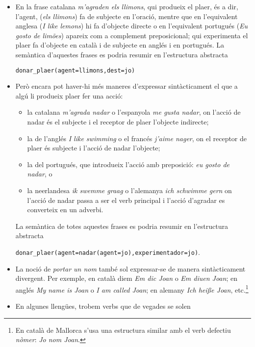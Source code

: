 \begin{itemize}
\item En la frase catalana \emph{m'agraden els llimons}, qui produeix
  el plaer, és a dir, l'agent, (\emph{els llimons}) fa de subjecte en
  l'oració, mentre que en l'equivalent anglesa (\emph{I like lemons})
  hi fa d'objecte directe o en l'equivalent portugués (\emph{Eu gosto
    de limões}) apareix com a complement preposicional; qui
  experimenta el plaer fa d'objecte en català i de subjecte en anglés
  i en portugués. La semàntica d'aquestes frases es podria resumir en
  l'estructura abstracta
  \begin{center}
    \texttt{donar\_plaer(agent=llimons,dest=jo)}
  \end{center}
\item \label{pg:magradanadar} Però encara pot haver-hi més maneres
  d'expressar sintàcticament el que a algú li produeix plaer fer una
  acció:
  \begin{itemize}
  \item la catalana \emph{m'agrada nadar} o l'espanyola \emph{me gusta
      nadar}, on l'acció de nadar és el subjecte i el receptor de
    plaer l'objecte indirecte;
  \item la de l'anglés \emph{I like swimming} o el francés
    \emph{j'aime nager}, on el receptor de plaer és subjecte i l'acció
    de nadar l'objecte;
  \item la del portugués, que introdueix l'acció amb preposició:
    \emph{eu gosto de nadar}, o
  \item la neerlandesa \emph{ik swemme graag} o l'alemanya \emph{ich
      schwimme gern} on l'acció de nadar passa a ser el verb principal
    i l'acció d'agradar es converteix en un adverbi.
  \end{itemize}
  La semàntica de totes aquestes frases es podria resumir en
  l'estructura abstracta
  \begin{center}
    \texttt{donar\_plaer(agent=nadar(agent=jo),experimentador=jo)}.
  \end{center}
\item La noció de \emph{portar un nom} també sol expressar-se de
  manera sintàcticament divergent. Per exemple, en català diem
  \emph{Em dic Joan} o \emph{Em diuen Joan}; en anglés \emph{My name
    is Joan} o \emph{I am called Joan}; en alemany \emph{Ich hei{\ss}e
    Joan}, etc.\footnote{En català de Mallorca s'usa una estructura
    similar amb el verb defectiu \emph{nòmer}: \emph{Jo nom Joan}.}
\item En algunes llengües, trobem verbs que de vegades se solen

\end{itemize}
